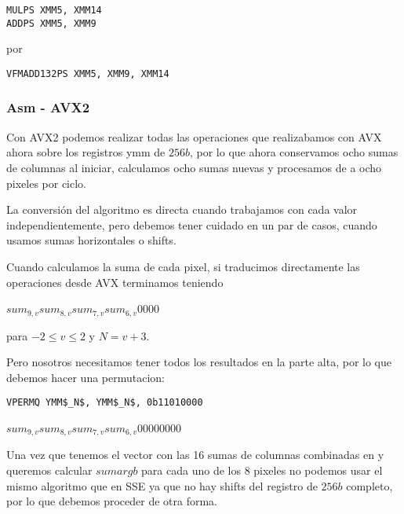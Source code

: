 \begin{lstlisting}
MULPS XMM5, XMM14
ADDPS XMM5, XMM9
\end{lstlisting}

por

\begin{lstlisting}
VFMADD132PS XMM5, XMM9, XMM14
\end{lstlisting}

\subsubsection{Asm - AVX2}

Con AVX2 podemos realizar todas las operaciones que realizabamos con AVX ahora sobre los registros ymm de $256b$, por lo que ahora conservamos ocho sumas de columnas al iniciar, calculamos ocho sumas nuevas y procesamos de a ocho pixeles por ciclo.

La conversión del algoritmo es directa cuando trabajamos con cada valor independientemente, pero debemos tener cuidado en un par de casos, cuando usamos sumas horizontales o shifts.

\vspace{5mm}

Cuando calculamos la suma de cada pixel, si traducimos directamente las operaciones desde AVX terminamos teniendo

 
{$sum_{9,v}$}{$sum_{8,v}$}{$sum_{7,v}$}{$sum_{6,v}$}{0}{0}{0}{0}

para $-2 \le v \le 2$ y $N = v+3$.

Pero nosotros necesitamos tener todos los resultados en la parte alta, por lo que debemos hacer una permutacion:

\begin{lstlisting}
VPERMQ YMM$_N$, YMM$_N$, 0b11010000
\end{lstlisting}

 
{$sum_{9,v}$}{$sum_{8,v}$}{$sum_{7,v}$}{$sum_{6,v}$}{0}{0}{0}{0}{0}{0}{0}{0}

\vspace{5mm}

Una vez que tenemos el vector con las 16 sumas de columnas combinadas en  y queremos calcular $sumargb$ para cada uno de los 8 pixeles no podemos usar el mismo algoritmo que en SSE ya que no hay shifts del registro de $256b$ completo, por lo que debemos proceder de otra forma.

